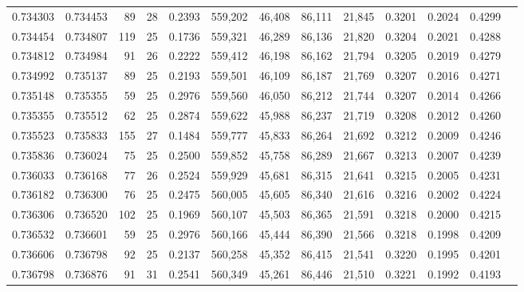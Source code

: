 \begin{tabular}{rrrrrrrrrrrrr}
0.734303 & 0.734453 &    89 &  28 &                                     0.2393 & 559,202 &  46,408 &  86,111 &  21,845 & 0.3201 & 0.2024 & 0.4299 \\
0.734454 & 0.734807 &   119 &  25 &                                     0.1736 & 559,321 &  46,289 &  86,136 &  21,820 & 0.3204 & 0.2021 & 0.4288 \\
0.734812 & 0.734984 &    91 &  26 &                                     0.2222 & 559,412 &  46,198 &  86,162 &  21,794 & 0.3205 & 0.2019 & 0.4279 \\
0.734992 & 0.735137 &    89 &  25 &                                     0.2193 & 559,501 &  46,109 &  86,187 &  21,769 & 0.3207 & 0.2016 & 0.4271 \\
0.735148 & 0.735355 &    59 &  25 &                                     0.2976 & 559,560 &  46,050 &  86,212 &  21,744 & 0.3207 & 0.2014 & 0.4266 \\
0.735355 & 0.735512 &    62 &  25 &                                     0.2874 & 559,622 &  45,988 &  86,237 &  21,719 & 0.3208 & 0.2012 & 0.4260 \\
0.735523 & 0.735833 &   155 &  27 &                                     0.1484 & 559,777 &  45,833 &  86,264 &  21,692 & 0.3212 & 0.2009 & 0.4246 \\
0.735836 & 0.736024 &    75 &  25 &                                     0.2500 & 559,852 &  45,758 &  86,289 &  21,667 & 0.3213 & 0.2007 & 0.4239 \\
0.736033 & 0.736168 &    77 &  26 &                                     0.2524 & 559,929 &  45,681 &  86,315 &  21,641 & 0.3215 & 0.2005 & 0.4231 \\
0.736182 & 0.736300 &    76 &  25 &                                     0.2475 & 560,005 &  45,605 &  86,340 &  21,616 & 0.3216 & 0.2002 & 0.4224 \\
0.736306 & 0.736520 &   102 &  25 &                                     0.1969 & 560,107 &  45,503 &  86,365 &  21,591 & 0.3218 & 0.2000 & 0.4215 \\
0.736532 & 0.736601 &    59 &  25 &                                     0.2976 & 560,166 &  45,444 &  86,390 &  21,566 & 0.3218 & 0.1998 & 0.4209 \\
0.736606 & 0.736798 &    92 &  25 &                                     0.2137 & 560,258 &  45,352 &  86,415 &  21,541 & 0.3220 & 0.1995 & 0.4201 \\
0.736798 & 0.736876 &    91 &  31 &                                     0.2541 & 560,349 &  45,261 &  86,446 &  21,510 & 0.3221 & 0.1992 & 0.4193 \\

\end{tabular}
